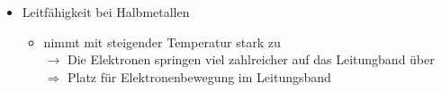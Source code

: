     \begin{itemize}
        \item Leitfähigkeit bei Halbmetallen 
        \begin{itemize}
            \item nimmt mit steigender Temperatur stark zu\\$\rightarrow$ Die Elektronen springen viel zahlreicher auf das Leitungband über\\$\Rightarrow$ Platz für Elektronenbewegung im Leitungsband
        \end{itemize}
    \end{itemize}

